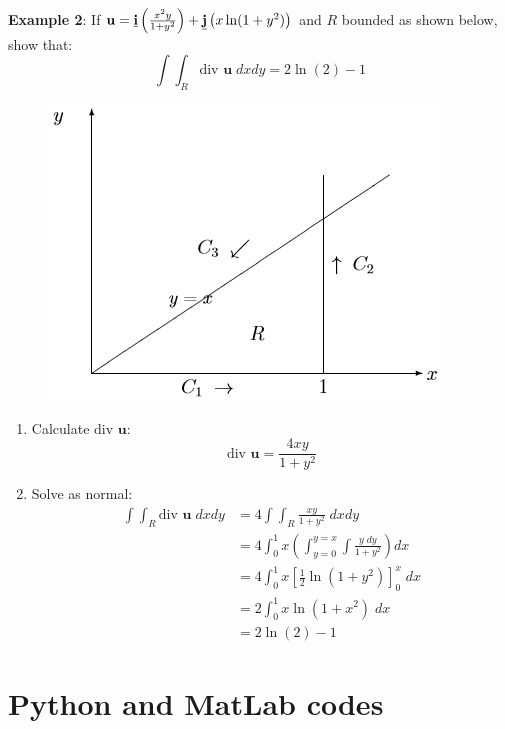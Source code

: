 \documentclass[10pt,a4paper]{article}
\begin{document}
\textbf{Example 2}: If
$\textbf{u}=\textbf{\underline{i}}\left(\frac{x^2y}{1+y^2}\right)+\textbf{\underline{j}}\left(x\ln(1+y^2)\right)$
and $R$ bounded as shown below, show that:
$$
    \int\int_R \text{div }\textbf{u}\;dxdy = 2\ln(2)-1
$$
\begin{figure} [h!]
    \centering
    \includegraphics[scale=0.7]{Stokes_Ex2.JPG}
\end{figure}
\begin{enumerate}
    \item Calculate $\text{div }\textbf{u}$:
    $$
        \text{div }\textbf{u} = \frac{4xy}{1+y^2}
    $$

    \item Solve as normal:
    \begin{align*}
        \int \int_R \text{div }\textbf{u}\;dxdy &= 4\int\int_R \frac{xy}{1+y^2}\;dxdy \\
        &= 4\int_0^1 x\left(\int_{y=0}^{y=x}\int\frac{y\;dy}{1+y^2}\right)dx \\
        &= 4\int_0^1 x\left[\frac{1}{2}\ln(1+y^2)\right]_0^x \; dx \\ 
        &= 2\int_0^1 x\ln(1+x^2)\;dx \\
        &= 2\ln(2)-1
    \end{align*}
\end{enumerate}





\pagebreak
\appendix
\section{Python and MatLab codes}
\end{document}
